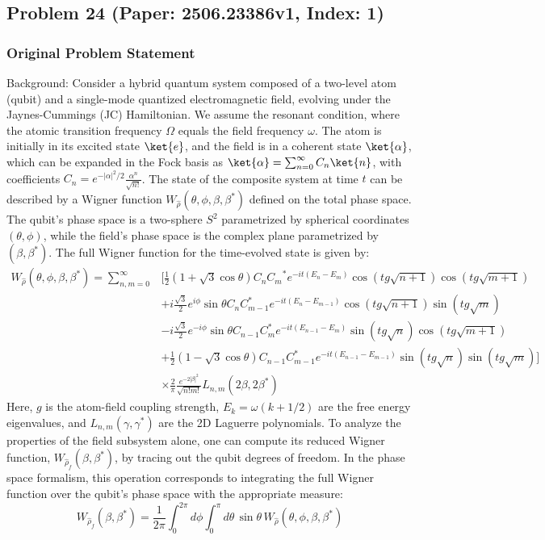 \documentclass[10pt]{article}
\begin{document}
\newpage
\subsection*{Problem 24 (Paper: 2506.23386v1, Index: 1)}

\subsubsection*{Original Problem Statement}
Background:
Consider a hybrid quantum system composed of a two-level atom (qubit) and a single-mode quantized electromagnetic field, evolving under the Jaynes-Cummings (JC) Hamiltonian. We assume the resonant condition, where the atomic transition frequency $\Omega$ equals the field frequency $\omega$. The atom is initially in its excited state $\ket{e}$, and the field is in a coherent state $\ket{\alpha}$, which can be expanded in the Fock basis as $\ket{\alpha} = \sum_{n=0}^{\infty} C_n \ket{n}$, with coefficients $C_n = e^{-|\alpha|^2/2} \frac{\alpha^n}{\sqrt{n!}}$. The state of the composite system at time $t$ can be described by a Wigner function $W_{\hat{\rho}}(\theta, \phi, \beta, \beta^*)$ defined on the total phase space. The qubit's phase space is a two-sphere $S^2$ parametrized by spherical coordinates $(\theta, \phi)$, while the field's phase space is the complex plane parametrized by $(\beta, \beta^*)$. The full Wigner function for the time-evolved state is given by:
\begin{align*}
W_{\hat{\rho}}(\theta, \phi, \beta,\beta^{*}) = \sum_{n,m=0}^{\infty} & \Big[\frac{1}{2}(1+\sqrt{3}\cos\theta) C_n{C_m}^{*} {e^{-it(E_n-E_m)}}\cos(tg\sqrt{n+1})\cos(tg\sqrt{m+1}) \\
& +i\frac{\sqrt{3}}{2}e^{i\phi}\sin\theta C_n C_{m-1}^{*}{e^{-it(E_n-E_{m-1})}}\cos(tg\sqrt{n+1})\sin(tg\sqrt{m}) \\
& -i\frac{\sqrt{3}}{2}e^{-i\phi}\sin\theta C_{n-1}C_m^{*} {e^{-it(E_{n-1}-E_m)}}\sin(tg\sqrt{n})\cos(tg\sqrt{m+1}) \\
& +\frac{1}{2}(1-\sqrt{3}\cos\theta) C_{n-1}C_{m-1}^{*} {e^{-it(E_{n-1}-E_{m-1})}}\sin(tg\sqrt{n})\sin(tg\sqrt{m})\Big] \\
& \times \frac{2}{\pi}\frac{e^{-2|\beta|^{2}}}{\sqrt{n!m!}}L_{n,m}(2\beta,2\beta^{*})
\end{align*}
Here, $g$ is the atom-field coupling strength, $E_k = \omega(k+1/2)$ are the free energy eigenvalues, and $L_{n,m}(\gamma, \gamma^*)$ are the 2D Laguerre polynomials. To analyze the properties of the field subsystem alone, one can compute its reduced Wigner function, $W_{\hat{\rho}_f}(\beta, \beta^*)$, by tracing out the qubit degrees of freedom. In the phase space formalism, this operation corresponds to integrating the full Wigner function over the qubit's phase space with the appropriate measure:
$$W_{\hat{\rho}_{f}}(\beta,\beta^{*})=\frac{1}{2\pi}\int_{0}^{2\pi} d\phi \int_{0}^{\pi} d\theta \, \sin\theta \, W_{\hat{\rho}}(\theta,\phi,\beta,\beta^{*})$$
\end{document}
